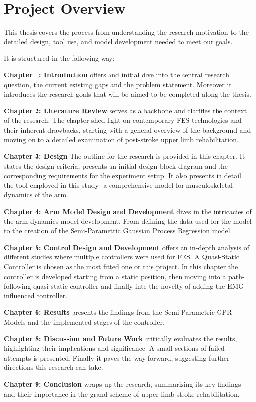 \section{Project Overview}

This thesis covers the process from understanding the research motivation to the detailed design, tool use, and model development needed to meet our goals.

It is structured in the following way:

\textbf{Chapter 1: Introduction} offers and initial dive into the central research question, the current existing gaps and the problem statement. Moreover it introduces the research goals that will be aimed to be completed along the thesis.

\textbf{Chapter 2: Literature Review} serves as a backbone and clarifies the context of the research. The chapter shed light on contemporary FES technologies and their inherent drawbacks, starting with a general overview of the background and moving on to a detailed examination of post-stroke upper limb rehabilitation.

\textbf{Chapter 3: Design} The outline for the research is provided in this chapter. It states the design criteria, presents an initial design block diagram and the corresponding requirements for the experiment setup. It also presents in detail the tool employed in this study- a comprehensive model for musculoskeletal dynamics of the arm. 

\textbf{Chapter 4: Arm Model Design and Development} dives in the intricacies of the arm dynamics model development. From defining the data used for the model to the creation of the Semi-Parametric Gaussian Process Regression model.

\textbf{Chapter 5: Control Design and Development} offers an in-depth analysis of different studies where multiple controllers were used for FES. A Quasi-Static Controller is chosen as the most fitted one or this project. In this chapter the controller is developed starting from a static position, then moving into a path-following quasi-static controller and finally into the novelty of adding the EMG-influenced controller.

\textbf{Chapter 6: Results} presents the findings from the Semi-Parametric GPR Models and the implemented stages of the controller.

\textbf{Chapter 8: Discussion and Future Work} critically evaluates the results, highlighting their implications and significance. A small sections of failed attempts is presented. Finally it paves the way forward, suggesting further directions this research can take.

\textbf{Chapter 9: Conclusion} wraps up the research, summarizing its key findings and their importance in the grand scheme of upper-limb stroke rehabilitation. 